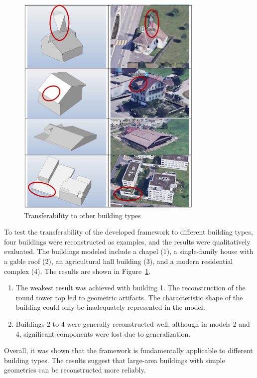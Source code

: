 \begin{figure}[htbp]
        \centering
        \includegraphics[width=0.8\textwidth]{images/transferability.JPG}
        \caption{Transferability to other building types}
        \label{fig:transferability}
\end{figure}

\begin{English}
    To test the transferability of the developed framework to different building types, four buildings were reconstructed as examples, and the results were qualitatively evaluated. The buildings modeled include a chapel (1), a single-family house with a gable roof (2), an agricultural hall building (3), and a modern residential complex (4). The results are shown in Figure~\ref{fig:transferability}.

    \begin{enumerate}
        \item The weakest result was achieved with building 1. The reconstruction of the round tower top led to geometric artifacts. The characteristic shape of the building could only be inadequately represented in the model.
        \item Buildings 2 to 4 were generally reconstructed well, although in models 2 and 4, significant components were lost due to generalization.
    \end{enumerate}

    Overall, it was shown that the framework is fundamentally applicable to different building types. The results suggest that large-area buildings with simple geometries can be reconstructed more reliably.
\end{English}


